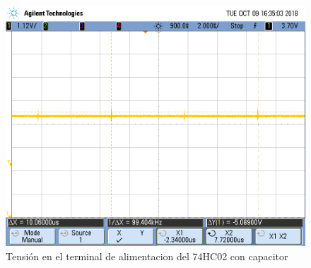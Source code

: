 \begin{figure}[H]
\centering
\includegraphics[scale=0.2]{imagenes/con_capacitor.png}
\caption{Tensión en el terminal de alimentacion del 74HC02 con capacitor}
\label{4_fig2} 
\end{figure}






